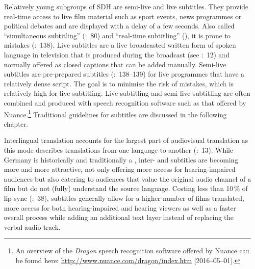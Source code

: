 Relatively young subgroups of SDH are semi-live and live subtitles. They provide real-time access to live film material such as sport events, news programmes or political debates and are displayed with a delay of a few seconds. Also called “simultaneous subtitling” (\citealt{Luyken1991}:~80) and “real-time subtitling” (\citealt{orero2006}), it is prone to mistakes (\citealt{Jungst2010}:~138). Live subtitles are a live broadcasted written form of spoken language in television that is produced during the broadcast (see \citealt{Kraus2010}:~12) and normally offered as closed captions that can be added manually. Semi-live subtitles are pre-prepared subtitles (\citealt{Jungst2010}:~138--139) for live programmes that have a relatively dense script. The goal is to minimise the risk of mistakes, which is relatively high for live subtitling. Live subtitling and semi-live subtitling are often combined and produced with speech recognition software such as that offered by Nuance.\footnote{An overview of the \textit{Dragon} speech recognition software offered by Nuance can be found here: \url{http://www.nuance.com/dragon/index.htm} [2016--05--01].} Traditional guidelines for  subtitles are discussed in the following chapter.

Interlingual translation accounts for the largest part of audiovisual translation as this mode describes translations from one language to another (\citealt{Diaz_cintas2007}:~13). While Germany is historically and traditionally a , inter- and  subtitles are becoming more and more attractive, not only offering more access for hearing-impaired audiences but also catering to audiences that value the original audio channel of a film but do not (fully) understand the source language. Costing less than 10\,\% of lip-sync  (\citealt{media_consulting_group2007}:~38), subtitles generally allow for a higher number of films translated, more access for both hearing-impaired and hearing viewers as well as a faster overall process while adding an additional text layer instead of replacing the verbal audio track.


